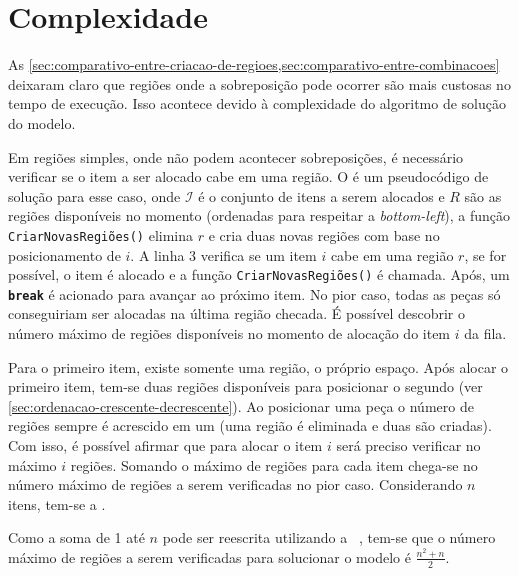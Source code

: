 \section{Complexidade}\label{sec:complexidade}

As \cref{sec:comparativo-entre-criacao-de-regioes,sec:comparativo-entre-combinacoes} deixaram claro
que regiões onde a sobreposição pode ocorrer são mais custosas no tempo de execução.
Isso acontece devido à complexidade do algoritmo de solução do modelo.

Em regiões simples, onde não podem acontecer sobreposições, é necessário verificar se o item a ser
alocado cabe em uma região.
O  é um pseudocódigo de solução para esse caso, onde $\mathcal{I}$ é o
conjunto de itens a serem alocados e $R$ são as regiões disponíveis no momento (ordenadas para
respeitar a \textit{bottom-left}), a função \texttt{CriarNovasRegiões()} elimina $r$ e cria duas
novas regiões com base no posicionamento de $i$.
A linha 3 verifica se um item $i$ cabe em uma região $r$, se for possível, o item é alocado e a
função \texttt{CriarNovasRegiões()} é chamada.
Após, um \texttt{\textbf{break}} é acionado para avançar ao próximo item.
No pior caso, todas as peças só conseguiriam ser alocadas na última região checada.
É possível descobrir o número máximo de regiões disponíveis no momento de alocação do item $i$ da
fila.



Para o primeiro item, existe somente uma região, o próprio espaço.
Após alocar o primeiro item, tem-se duas regiões disponíveis para posicionar o segundo (ver
\cref{sec:ordenacao-crescente-decrescente}).
Ao posicionar uma peça o número de regiões sempre é acrescido em um (uma região é eliminada e duas
são criadas).
Com isso, é possível afirmar que para alocar o item $i$ será preciso verificar no máximo $i$ regiões.
Somando o máximo de regiões para cada item chega-se no número máximo de regiões a serem verificadas
no pior caso.
Considerando $n$ itens, tem-se a .



Como a soma de 1 até $n$ pode ser reescrita utilizando a 
~\cite{merca2015alternative}, tem-se que o número máximo de regiões a serem verificadas
para solucionar o modelo é $\frac{n^2 + n}{2}$.



